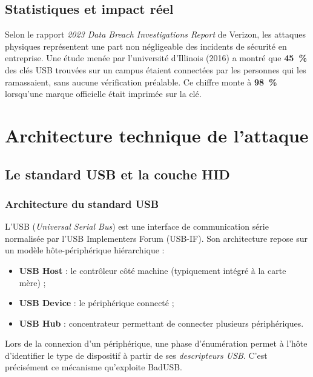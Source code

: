 \documentclass[12pt,a4paper]{report}
\begin{document}
\section{Statistiques et impact réel}

Selon le rapport \textit{2023 Data Breach Investigations Report} de Verizon, les attaques physiques représentent une part non négligeable des incidents de sécurité en entreprise. Une étude menée par l'université d'Illinois (2016) a montré que \textbf{45~\%} des clés USB trouvées sur un campus étaient connectées par les personnes qui les ramassaient, sans aucune vérification préalable. Ce chiffre monte à \textbf{98~\%} lorsqu'une marque officielle était imprimée sur la clé.

\chapter{Architecture technique de l'attaque}
\label{chap:archi}

\section{Le standard USB et la couche HID}

\subsection{Architecture du standard USB}

L'USB (\textit{Universal Serial Bus}) est une interface de communication série normalisée par l'USB Implementers Forum (USB-IF). Son architecture repose sur un modèle hôte-périphérique hiérarchique :

\begin{itemize}
  \item \textbf{USB Host} : le contrôleur côté machine (typiquement intégré à la carte mère) ;
  \item \textbf{USB Device} : le périphérique connecté ;
  \item \textbf{USB Hub} : concentrateur permettant de connecter plusieurs périphériques.
\end{itemize}

Lors de la connexion d'un périphérique, une phase d'énumération permet à l'hôte d'identifier le type de dispositif à partir de ses \textit{descripteurs USB}. C'est précisément ce mécanisme qu'exploite BadUSB.
\end{document}
